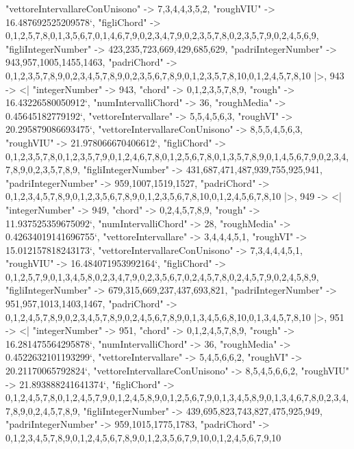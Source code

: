 \documentclass[
]{article}
\begin{document}
\begin{DatasetVerbatim}
    "vettoreIntervallareConUnisono" -> {7,3,4,4,3,5,2},
    "roughVIU" -> 16.487692525209578`,
    "figliChord" -> {{0,1,2,5,7,8},{0,1,3,5,6,7},{0,1,4,6,7,9},{0,2,3,4,7,9},{0,2,3,5,7,8},{0,2,3,5,7,9},{0,2,4,5,6,9}},
    "figliIntegerNumber" -> {423,235,723,669,429,685,629},
    "padriIntegerNumber" -> {943,957,1005,1455,1463},
    "padriChord" -> {{0,1,2,3,5,7,8,9},{0,2,3,4,5,7,8,9},{0,2,3,5,6,7,8,9},{0,1,2,3,5,7,8,10},{0,1,2,4,5,7,8,10}}
  |>,
  943 -> <|
    "integerNumber" -> 943,
    "chord" -> {0,1,2,3,5,7,8,9},
    "rough" -> 16.43226580050912`,
    "numIntervalliChord" -> 36,
    "roughMedia" -> 0.45645182779192`,
    "vettoreIntervallare" -> {5,5,4,5,6,3},
    "roughVI" -> 20.295879086693475`,
    "vettoreIntervallareConUnisono" -> {8,5,5,4,5,6,3},
    "roughVIU" -> 21.978066670406612`,
    "figliChord" -> {{0,1,2,3,5,7,8},{0,1,2,3,5,7,9},{0,1,2,4,6,7,8},{0,1,2,5,6,7,8},{0,1,3,5,7,8,9},{0,1,4,5,6,7,9},{0,2,3,4,7,8,9},{0,2,3,5,7,8,9}},
    "figliIntegerNumber" -> {431,687,471,487,939,755,925,941},
    "padriIntegerNumber" -> {959,1007,1519,1527},
    "padriChord" -> {{0,1,2,3,4,5,7,8,9},{0,1,2,3,5,6,7,8,9},{0,1,2,3,5,6,7,8,10},{0,1,2,4,5,6,7,8,10}}
  |>,
  949 -> <|
    "integerNumber" -> 949,
    "chord" -> {0,2,4,5,7,8,9},
    "rough" -> 11.937525359675092`,
    "numIntervalliChord" -> 28,
    "roughMedia" -> 0.42634019141696755`,
    "vettoreIntervallare" -> {3,4,4,4,5,1},
    "roughVI" -> 15.012157818243173`,
    "vettoreIntervallareConUnisono" -> {7,3,4,4,4,5,1},
    "roughVIU" -> 16.484071953992164`,
    "figliChord" -> {{0,1,2,5,7,9},{0,1,3,4,5,8},{0,2,3,4,7,9},{0,2,3,5,6,7},{0,2,4,5,7,8},{0,2,4,5,7,9},{0,2,4,5,8,9}},
    "figliIntegerNumber" -> {679,315,669,237,437,693,821},
    "padriIntegerNumber" -> {951,957,1013,1403,1467},
    "padriChord" -> {{0,1,2,4,5,7,8,9},{0,2,3,4,5,7,8,9},{0,2,4,5,6,7,8,9},{0,1,3,4,5,6,8,10},{0,1,3,4,5,7,8,10}}
  |>,
  951 -> <|
    "integerNumber" -> 951,
    "chord" -> {0,1,2,4,5,7,8,9},
    "rough" -> 16.281475564295878`,
    "numIntervalliChord" -> 36,
    "roughMedia" -> 0.4522632101193299`,
    "vettoreIntervallare" -> {5,4,5,6,6,2},
    "roughVI" -> 20.21170065792824`,
    "vettoreIntervallareConUnisono" -> {8,5,4,5,6,6,2},
    "roughVIU" -> 21.893888241641374`,
    "figliChord" -> {{0,1,2,4,5,7,8},{0,1,2,4,5,7,9},{0,1,2,4,5,8,9},{0,1,2,5,6,7,9},{0,1,3,4,5,8,9},{0,1,3,4,6,7,8},{0,2,3,4,7,8,9},{0,2,4,5,7,8,9}},
    "figliIntegerNumber" -> {439,695,823,743,827,475,925,949},
    "padriIntegerNumber" -> {959,1015,1775,1783},
    "padriChord" -> {{0,1,2,3,4,5,7,8,9},{0,1,2,4,5,6,7,8,9},{0,1,2,3,5,6,7,9,10},{0,1,2,4,5,6,7,9,10}}

\end{DatasetVerbatim}
\end{document}
